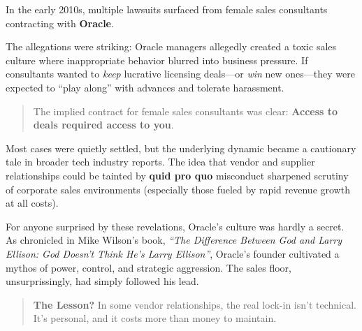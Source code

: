 \begin{tcolorbox}[colback=blue!5!white, colframe=blue!50!black,
  title={Historical Sidebar: When Dependency Gets Personal --- The Oracle Consultant Allegations}]

In the early 2010s, multiple lawsuits surfaced from female sales consultants contracting with \textbf{Oracle}.  

\medskip

The allegations were striking: Oracle managers allegedly created a toxic sales culture where inappropriate behavior blurred into business pressure.  If consultants wanted to \textit{keep} lucrative licensing deals—or \textit{win} new ones—they were expected to ``play along'' with advances and tolerate harassment.

\medskip

\begin{quote}
The implied contract for female sales consultants was clear: \textbf{Access to deals required access to you}.
\end{quote}

\medskip

Most cases were quietly settled, but the underlying dynamic became a cautionary tale in broader tech industry reports.  The idea that vendor and supplier relationships could be tainted by \textbf{quid pro quo} misconduct sharpened scrutiny of corporate sales environments (especially those fueled by rapid revenue growth at all costs).

\medskip

For anyone surprised by these revelations, Oracle's culture was hardly a secret.  As chronicled in Mike Wilson's book, \textit{``The Difference Between God and Larry Ellison: God Doesn't Think He's Larry Ellison''}, Oracle’s founder cultivated a mythos of power, control, and strategic aggression.  The sales floor, unsurprissingly, had simply followed his lead.

\medskip

\begin{quote}
\textbf{The Lesson?} In some vendor relationships, the real lock-in isn't technical. It's personal, and it costs more than money to maintain.
\end{quote}

\end{tcolorbox}

